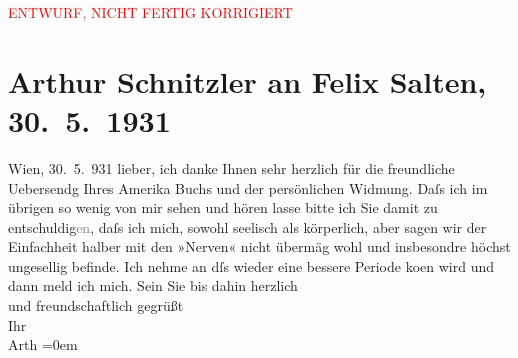 
\begin{center}
            \textcolor{red}{ENTWURF, NICHT FERTIG KORRIGIERT}
                      \end{center}
            
         
         \newcommand{\erwaehntePersonen}{Personen: Felix Salten}
         \newcommand{\erwaehnteOrte}{Orte: Amerika, Wien}
         \newcommand{\erwaehnteWerke}{Werke: Fünf Minuten Amerika}
               \section[Arthur Schnitzler an Felix Salten, 30. 5. 1931]{ Arthur Schnitzler an Felix Salten, 30. 5. 1931}\nopagebreak{}\rehead{ }\begin{ledgroupsized}[t]{13cm}\normalsize\beginnumbering \toendnotes[C]{\smallbreak\pagebreak[2]} 
\toendnotes[C]{\smallbreak}\pstart
           \raggedleft{}{\pb}Wien, 30. 5. 931\pend
           \pstart
           lieber, ich danke Ihnen sehr herzlich für die freundliche Uebersendg
               Ihres 
                  Amerika Buchs und der persönlichen Widmung. Daſs ich im übrigen
               so wenig von mir sehen und hören lasse bitte ich Sie damit zu
                  entschuldig\textcolor{gray}{en}, daſs ich mich, sowohl seelisch als körperlich,
               aber sagen wir der Einfachheit halber mit den »Nerven« nicht übermäg wohl und
               insbesondre höchst ungesellig befinde. Ich nehme an dſs wieder {\pb}eine
               bessere Periode ko{\geminationm}en wird und dann meld ich mich. \pend
           \pstart
           Sein Sie bis dahin herzlich {\\[\baselineskip]}und freundschaftlich gegrüßt {\\[\baselineskip]}Ihr {\\[\baselineskip]}\spacefill\mbox{Arth}\pend
           \leftskip=0em{}
         
         \endnumbering{}\end{ledgroupsized}\begin{anhang}\end{anhang}\newcommand{\dateiname}{L03026}\newcommand{\titel}{Arthur Schnitzler an Felix Salten, 30. 5. 1931}\newcommand{\editorInnen}{Martin Anton Müller und Laura Untner}
      